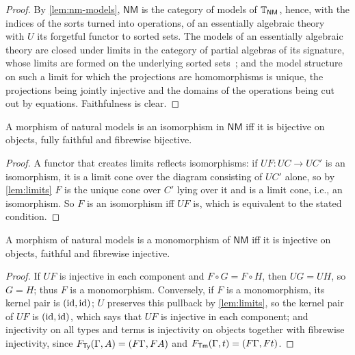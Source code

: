 \begin{proof}
    By \cref{lem:nm-models}, $\mathsf{NM}$ is the category of models of $\mathbb{T}_{\mathsf{NM}}$, hence, with the indices of the sorts turned into operations, of an essentially algebraic theory~\cite[Def.~3.34]{AdamekRosicky1994} with $U$ its forgetful functor to sorted sets. The models of an essentially algebraic theory are closed under limits in the category of partial algebras of its signature, whose limits are formed on the underlying sorted sets~\cite[proof of Thm.~3.36]{AdamekRosicky1994}; and the model structure on such a limit for which the projections are homomorphisms is unique, the projections being jointly injective and the domains of the operations being cut out by equations. Faithfulness is clear.
\end{proof}

\begin{lemma}\label{lem:iso}
    A morphism of natural models is an isomorphism in $\mathsf{NM}$ iff it is bijective on objects, fully faithful and fibrewise bijective.
\end{lemma}

\begin{proof}
    A functor that creates limits reflects isomorphisms: if $UF : UC \to UC'$ is an isomorphism, it is a limit cone over the diagram consisting of $UC'$ alone, so by \cref{lem:limits} $F$ is the unique cone over $C'$ lying over it and is a limit cone, i.e., an isomorphism. So $F$ is an isomorphism iff $UF$ is, which is equivalent to the stated condition.
\end{proof}

\begin{lemma}\label{lem:mono}
    A morphism of natural models is a monomorphism of $\mathsf{NM}$ iff it is injective on objects, faithful and fibrewise injective.
\end{lemma}

\begin{proof}
    If $UF$ is injective in each component and $F \circ G = F \circ H$, then $UG = UH$, so $G = H$; thus $F$ is a monomorphism. Conversely, if $F$ is a monomorphism, its kernel pair is $(\mathrm{id}, \mathrm{id})$; $U$ preserves this pullback by \cref{lem:limits}, so the kernel pair of $UF$ is $(\mathrm{id}, \mathrm{id})$, which says that $UF$ is injective in each component; and injectivity on all types and terms is injectivity on objects together with fibrewise injectivity, since $F_{\mathsf{Ty}}(\Gamma, A) = (F\Gamma, FA)$ and $F_{\mathsf{Tm}}(\Gamma, t) = (F\Gamma, Ft)$.
\end{proof}

